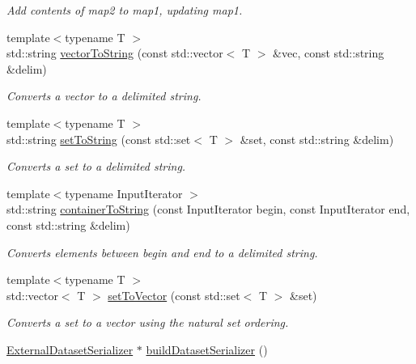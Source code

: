 \begin{DoxyCompactItemize}
\begin{DoxyCompactList}\small\item\em Add contents of map2 to map1, updating map1. \item\end{DoxyCompactList}\item 
{\footnotesize template$<$typename T $>$ }\\std::string \hyperlink{namespaceBUSBOY_a68fd7fa31d51e040063f543e540a3ab4}{vectorToString} (const std::vector$<$ T $>$ \&vec, const std::string \&delim)
\begin{DoxyCompactList}\small\item\em Converts a vector to a delimited string. \item\end{DoxyCompactList}\item 
{\footnotesize template$<$typename T $>$ }\\std::string \hyperlink{namespaceBUSBOY_ab379f561542ab99122e582c5d8d7a4de}{setToString} (const std::set$<$ T $>$ \&set, const std::string \&delim)
\begin{DoxyCompactList}\small\item\em Converts a set to a delimited string. \item\end{DoxyCompactList}\item 
{\footnotesize template$<$typename InputIterator $>$ }\\std::string \hyperlink{namespaceBUSBOY_a93313a8b24721856c352d58ce902de0b}{containerToString} (const InputIterator begin, const InputIterator end, const std::string \&delim)
\begin{DoxyCompactList}\small\item\em Converts elements between begin and end to a delimited string. \item\end{DoxyCompactList}\item 
{\footnotesize template$<$typename T $>$ }\\std::vector$<$ T $>$ \hyperlink{namespaceBUSBOY_a30565802dd1d32848b0780a68bb1c3f2}{setToVector} (const std::set$<$ T $>$ \&set)
\begin{DoxyCompactList}\small\item\em Converts a set to a vector using the natural set ordering. \item\end{DoxyCompactList}\item 
\hyperlink{classBUSBOY_1_1ExternalDatasetSerializer}{ExternalDatasetSerializer} $\ast$ \hyperlink{namespaceBUSBOY_aae13194f46d8e019992b0f869869ff59}{buildDatasetSerializer} ()

\end{DoxyCompactItemize}
